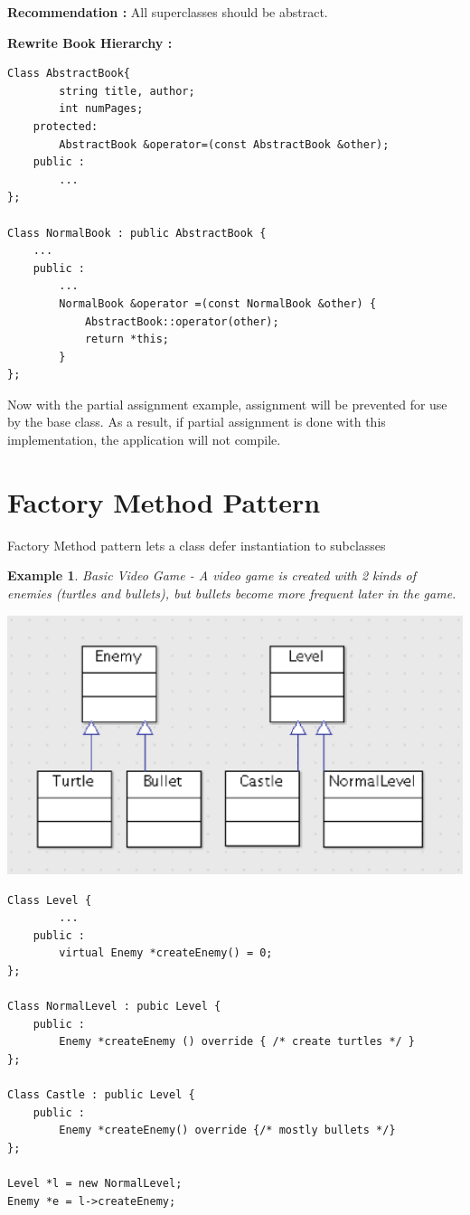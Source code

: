 \documentclass{article}
\newtheorem{ex}[theorem]{Example}
\begin{document}
\textbf{Recommendation :} All superclasses should be abstract. 

\textbf{Rewrite Book Hierarchy :}

\begin{lstlisting}
Class AbstractBook{
		string title, author;
		int numPages;
	protected:
		AbstractBook &operator=(const AbstractBook &other);
	public :
		...
};

Class NormalBook : public AbstractBook {
	...
	public :
		...
		NormalBook &operator =(const NormalBook &other) {
			AbstractBook::operator(other);
			return *this;
		}
};
\end{lstlisting}

Now with the partial assignment example, assignment will be prevented for use by the base class. As a result, if partial assignment is done with this implementation, the application will not compile. 

\section{Factory Method Pattern}

Factory Method pattern lets a class defer instantiation to subclasses

\begin{ex} Basic Video Game -
A video game is created with 2 kinds of enemies (turtles and bullets), but bullets become more frequent later in the game.

\begin{center}
\includegraphics[scale=0.7]{lec9-2}
\end{center}

\begin{lstlisting}
Class Level {
		...
	public :
		virtual Enemy *createEnemy() = 0;
};

Class NormalLevel : pubic Level {
	public : 
		Enemy *createEnemy () override { /* create turtles */ }
};

Class Castle : public Level {
	public : 
		Enemy *createEnemy() override {/* mostly bullets */}
};

Level *l = new NormalLevel;
Enemy *e = l->createEnemy;

\end{lstlisting}
\end{ex}
\end{document}
